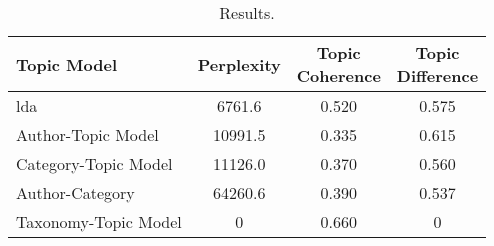 \begin{table}[h]
	\centering
	\caption{Results.}
	\begin{tabular}{l|c|c|c}
		Topic Model & Perplexity & \makecell{Topic \\ Coherence} & \makecell{Topic \\ Difference} \\
		\midrule
		\Acrlong{lda} & 6761.6 & 0.520 & 0.575 \\
		Author-Topic Model & 10991.5 & 0.335 & 0.615 \\
		Category-Topic Model & 11126.0 & 0.370 & 0.560 \\
		Author-Category & 64260.6 & 0.390 & 0.537 \\
		Taxonomy-Topic Model & 0 & 0.660 & 0 \\
	\end{tabular}
	\label{tab:metric_results}
\end{table}